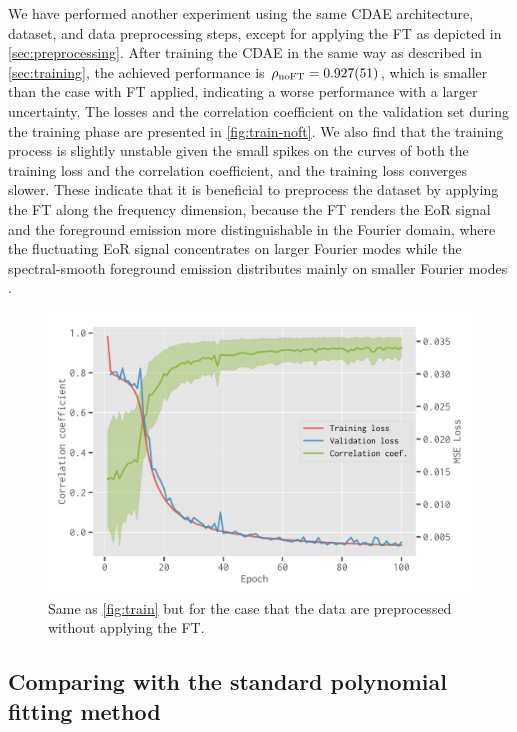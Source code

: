 \documentclass[letters,fleqn,usenatbib,onecolumn]{mnras}
\newcommand{\R}[1]{\mathrm{#1}}
\begin{document}
We have performed another experiment using the same CDAE architecture,
dataset, and data preprocessing steps, except for applying the FT
as depicted in \autoref{sec:preprocessing}.
After training the CDAE in the same way as described in
\autoref{sec:training}, the achieved performance is
$\rho_{\R{noFT}} = \num{0.927 +- 0.051}$, which is smaller than the case
with FT applied, indicating a worse performance with a larger uncertainty.
The losses and the correlation coefficient on the validation set
during the training phase are presented in \autoref{fig:train-noft}.
We also find that the training process is slightly unstable given the
small spikes on the curves of both the training loss and the correlation
coefficient, and the training loss converges slower.
These indicate that it is beneficial to preprocess the
dataset by applying the FT along the frequency dimension, because the FT
renders the EoR signal and the foreground emission more distinguishable
in the Fourier domain, where the fluctuating EoR signal concentrates on
larger Fourier modes while the spectral-smooth foreground emission
distributes mainly on smaller Fourier modes \citep[e.g.,][]{parsons2012}.

\begin{figure}
  \centering
  \includegraphics[width=\myfigwidth]{cdae-train-noft}
  \caption{\label{fig:train-noft}%
    Same as \autoref{fig:train} but for the case that the data are
    preprocessed without applying the FT.
  }
\end{figure}


\subsection{Comparing with the standard polynomial fitting method}
\label{sec:polyfit}
\end{document}
